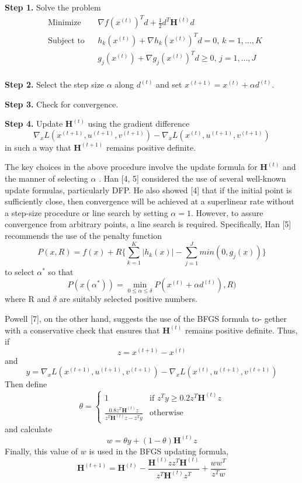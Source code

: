 \documentclass{article}
\begin{document}
\textbf{Step 1. }Solve the problem
\begin{equation*}
    \begin{aligned}
        & \text{Minimize}
        & & \nabla f(x^{(t)})^Td + \frac{1}{2}d^T\textbf{H}^{(t)}d \\
        & \text{Subject to}
        & & h_k(x^{(t)}) + \nabla h_k(x^{(t)})^Td = 0, \, k = 1, \ldots, K\\
        &&& g_j(x^{(t)}) + \nabla g_j(x^{(t)})^Td \geq 0, \, j = 1, \ldots, J\\
    \end{aligned}
\end{equation*}

\textbf{Step 2. }Select the step size $\alpha$ along $d^{(t)}$ and set $x^{(t+1)} = x^{(t)} + \alpha d^{(t)}$.

\textbf{Step 3. }Check for convergence.

\textbf{Step 4. }Update $\textbf{H}^{(t)}$ using the gradient difference
\[\nabla_xL(x^{(t+1)}, u^{(t+1)}, v^{(t+1)}) - \nabla_xL(x^{(t)}, u^{(t+1)}, v^{(t+1)})\]
in such a way that $\textbf{H}^{(t+1)}$ remains positive definite.\newline

The key choices in the above procedure involve the update formula for $\textbf{H}^{(t)}$ and the manner of selecting $\alpha$ . Han [4, 5] considered the use of several well-known update formulas, particularly DFP. He also showed [4] that if the initial point is sufficiently close, then convergence will be achieved at a superlinear rate without a step-size procedure or line search by setting $\alpha = 1$. However, to assure convergence from arbitrary points, a line search is required. Specifically, Han [5] recommends the use of the penalty function
\[P(x, R) = f(x) + R\{\sum_{k=1}^{K} |h_k(x)| - \sum_{j=1}^{J} min(0,g_j(x))\}\]
to select $\alpha^*$ so that
\[P(x(\alpha^*)) = \min_{0\leq\alpha\leq\delta} P(x^{(t)} + \alpha d^{(t)}), R)\]
where R and $\delta$ are suitably selected positive numbers.\par
Powell [7], on the other hand, suggests the use of the BFGS formula to-
gether with a conservative check that ensures that $\textbf{H}^{(t)}$ remains positive definite. Thus, if
\[z = x^{(t+1)} - x^{(t)}\]
and
\[y = \nabla_xL(x^{(t+1)}, u^{(t+1)}, v^{(t+1)}) - \nabla_xL(x^{(t)}, u^{(t+1)}, v^{(t+1)})\]
Then define
\[
    \theta = 
    \begin{cases}
        1 & \text{if $z^Ty \geq 0.2z^T\textbf{H}^{(t)}z$}\\
        \frac{0.8z^T\textbf{H}^{(t)}z}{z^T\textbf{H}^{(t)}z - z^Ty} & \text{otherwise}
    \end{cases}
\]
and calculate
\[w = \theta y + (1-\theta) \textbf{H}^{(t)}z\]
Finally, this value of $w$ is used in the BFGS updating formula,
\[\textbf{H}^{(t+1)} = \textbf{H}^{(t)}-\frac{\textbf{H}^{(t)}zz^T\textbf{H}^{(t)}}{z^T\textbf{H}^{(t)}z^T}+\frac{ww^T}{z^Tw} \]
\end{document}
